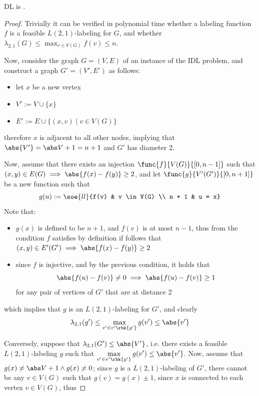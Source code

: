 \documentclass[a4paper, 12pt]{report}
\begin{document}
    \begin{framedthm}{}
        DL is \NPComplete.
    \end{framedthm}

    \begin{proof}
        Trivially it can be verified in polynomial time whether a labeling function $f$ is a feasible $L(2,1)$-labeling for $G$, and whether $\displaystyle \lambda_{2,1}(G) \le \max_{v \in V(G)}{f(v)} \le n$.

        Now, consider the graph $G = (V, E)$ of an instance of the IDL problem, and construct a graph $G' = (V', E')$ as follows:

        \begin{itemize}
            \item let $x$ be a new vertex
            \item $V' := V \cup \{x\}$
            \item $E' := E \cup \{(x, v) \mid v \in V(G)\}$
        \end{itemize}
        
        therefore $x$ is adjacent to all other nodes, implying that $\abs{V'} = \abs V + 1 = n + 1$ and $G'$ has diameter 2.

        Now, assume that there exists an injection $\func{f}{V(G)}{[0, n - 1]}$ such that $(x, y) \in E(G) \implies \abs{f(x) - f(y)} \ge 2$, and let $\func{g}{V'(G')}{[0, n + 1]}$ be a new function such that $$g(u) := \soe{ll}{f(v) & v \in V(G) \\ n + 1 & u = x}$$ Note that:

        \begin{itemize}
            \item $g(x)$ is defined to be $n + 1$, and $f(v)$ is at most $n - 1$, thus from the condition $f$ satisfies by definition if follows that $(x, y) \in E'(G') \implies \abs{f(x) - f(y)} \ge 2$
            \item since $f$ is injective, and by the previous condition, it holds that $$\abs{f(u) - f(v)} \neq 0 \implies \abs{f(u) - f(v)} \ge 1$$ for any pair of vertices of $G'$ that are at distance 2
        \end{itemize}

        which implies that $g$ is an $L(2,1)$-labeling for $G'$, and clearly $$\displaystyle \lambda_{2,1}(g') \le \max_{v ' \in v'\rbk{g'}}{g(v')} \le \abs{v'}$$

        Conversely, suppose that $\lambda_{2,1}(G') \le \abs{V'}$, i.e. there exists a feasible $L(2,1)$-labeling $g$ such that $\displaystyle \max_{v ' \in v'\rbk{g'}}{g(v')} \le \abs{v'}$. Now, assume that $g(x) \neq \abs V + 1 \land g(x) \neq 0$; since $g$ is a $L(2,1)$-labeling of $G'$, there cannot be any $v \in V(G)$ such that $g(v) = g(x) \pm 1$, since $x$ is connected to each vertex $v \in V(G)$, thus 


\end{proof}
\end{document}
